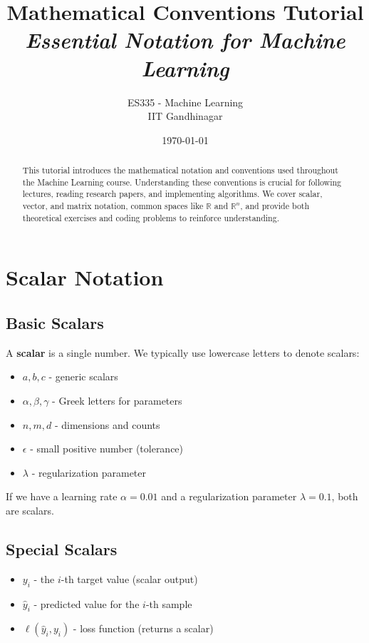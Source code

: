 \documentclass{article}
\title{\textbf{Mathematical Conventions Tutorial} \\ \textit{Essential Notation for Machine Learning}}
\author{ES335 - Machine Learning \\ IIT Gandhinagar}
\date{\today}
\providecommand{\Real}{\mathbb{R}}
\newcounter{exercise}
\newcounter{coding}
\begin{document}
\maketitle

\begin{abstract}
This tutorial introduces the mathematical notation and conventions used throughout the Machine Learning course. Understanding these conventions is crucial for following lectures, reading research papers, and implementing algorithms. We cover scalar, vector, and matrix notation, common spaces like $\Real$ and $\Real^n$, and provide both theoretical exercises and coding problems to reinforce understanding.
\end{abstract}

\tableofcontents
\newpage

\section{Scalar Notation}

\subsection{Basic Scalars}
A \textbf{scalar} is a single number. We typically use lowercase letters to denote scalars:
\begin{itemize}
    \item $a, b, c$ - generic scalars
    \item $\alpha, \beta, \gamma$ - Greek letters for parameters
    \item $n, m, d$ - dimensions and counts
    \item $\epsilon$ - small positive number (tolerance)
    \item $\lambda$ - regularization parameter
\end{itemize}

\begin{tcolorbox}[colback=green!5!white,colframe=green!75!black,title=Example]
If we have a learning rate $\alpha = 0.01$ and a regularization parameter $\lambda = 0.1$, both are scalars.
\end{tcolorbox}

\subsection{Special Scalars}
\begin{itemize}
    \item $y_i$ - the $i$-th target value (scalar output)
    \item $\hat{y}_i$ - predicted value for the $i$-th sample
    \item $\ell(\hat{y}_i, y_i)$ - loss function (returns a scalar)
\end{itemize}
\end{document}
